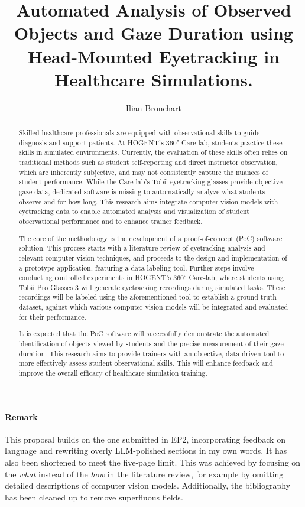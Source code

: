 \documentclass[english]{hogent-article}
\title{Automated Analysis of Observed Objects and Gaze Duration using Head-Mounted Eyetracking in Healthcare Simulations.}
\author{Ilian Bronchart}
\begin{document}
\begin{abstract}
Skilled healthcare professionals are equipped with observational skills to guide diagnosis and support patients.
At HOGENT's 360° Care-lab, students practice these skills in simulated environments.
Currently, the evaluation of these skills often relies on traditional methods such as student 
self-reporting and direct instructor observation, which are inherently subjective, and may not 
consistently capture the nuances of student performance. 
While the Care-lab's Tobii eyetracking glasses provide objective gaze data, dedicated software 
is missing to automatically analyze what students observe and for how long.
This research aims integrate computer vision models with eyetracking data 
to enable automated analysis and visualization of student observational performance and to enhance trainer feedback.

The core of the methodology is the development of a proof-of-concept (PoC) software solution. 
This process starts with a literature review of eyetracking analysis and relevant computer vision techniques, 
and proceeds to the design and implementation of a prototype application, featuring a data-labeling tool. 
Further steps involve conducting controlled experiments in HOGENT's 360° Care-lab, 
where students using Tobii Pro Glasses 3 will generate eyetracking recordings during simulated tasks. 
These recordings will be labeled using the aforementioned tool to establish a ground-truth dataset, 
against which various computer vision models will be integrated and evaluated for their 
performance.

It is expected that the PoC software will successfully demonstrate the automated identification 
of objects viewed by students and the precise measurement of their gaze duration. 
This research aims to provide trainers with an objective, data-driven tool to more effectively assess 
student observational skills. This will enhance feedback and improve the overall efficacy of healthcare simulation training.
\end{abstract}

\bigskip

\paragraph{Remark}

This proposal builds on the one submitted in EP2, incorporating feedback on language and rewriting overly LLM-polished sections in my own words. 
It has also been shortened to meet the five-page limit. This was achieved by focusing on the \textit{what} instead of the \textit{how} in the literature review, for example 
by omitting detailed descriptions of computer vision models.
Additionally, the bibliography has been cleaned up to remove superfluous fields.
\end{document}
